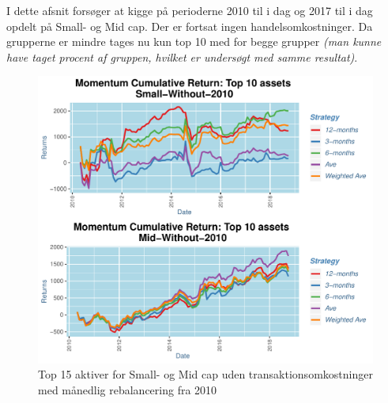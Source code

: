 \documentclass[]{article}
\begin{document}
I dette afsnit forsøger at kigge på perioderne 2010 til i dag og 2017
til i dag opdelt på Small- og Mid cap. Der er fortsat ingen
handelsomkostninger. Da grupperne er mindre tages nu kun top 10 med for
begge grupper \emph{(man kunne have taget procent af gruppen, hvilket er
undersøgt med samme resultat)}.

\begin{figure}
\centering
\includegraphics{IPA_Small_and_Mid_files/figure-latex/fig1-1.pdf}
\caption{\label{fig:OpdeltwithOut2010}Top 15 aktiver for Small- og Mid
cap uden transaktionsomkostninger med månedlig rebalancering fra 2010}
\end{figure}
\end{document}
